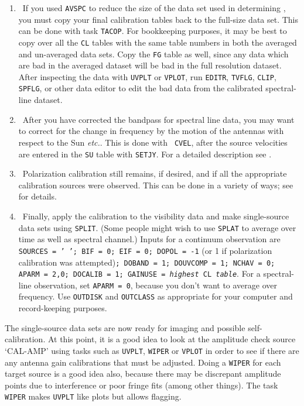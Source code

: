 
\begin{enumerate}

\item\ {If you used {\tt AVSPC} to reduce the size of the data set
used in determining , you must copy your final
calibration tables back to the full-size data set.  This can be done
with task {\tt TACOP}\@.  For bookkeeping purposes, it may be best to
copy over all the {\tt CL} tables with the same table numbers in both
the averaged and un-averaged data sets. Copy the {\tt FG} table as
well, since  any data which are bad in the averaged dataset will be
bad in the full resolution dataset.  After inspecting the data with
{\tt UVPLT} or {\tt VPLOT}, run {\tt EDITR}, {\tt TVFLG}, {\tt CLIP},
{\tt SPFLG}, or other data editor to edit the bad data from the
calibrated spectral-line dataset.}

\item\ {After you have corrected the bandpass for spectral line data,
you may want to correct for the change in frequency by the motion of the
antennas with respect to the Sun {\it etc.}. This is done with {\tt
CVEL}, after the source velocities are entered in the {\tt SU} table
with {\tt SETJY}\@.  For a detailed description see \@.\@}

\item\ {Polarization calibration still remains, if desired, and if all
the appropriate calibration sources were observed.  This can be done
in a variety of ways; see  for details.}

\item\ {Finally, apply the calibration to the visibility data and make
single-source data sets using {\tt SPLIT}\@.  (Some people
might wish to use {\tt SPLAT} to average over time as well as spectral
channel.) Inputs for a continuum observation are {\tt SOURCES = '~';
BIF = 0; EIF = 0; DOPOL = -1} (or 1 if polarization calibration was
attempted){\tt ; DOBAND = 1; DOUVCOMP = 1; NCHAV = 0; APARM = 2,0;
DOCALIB = 1; GAINUSE = {\it highest} CL {\it table}}\@.  For a
spectral-line observation, set {\tt APARM = 0}, because you don't want to
average over frequency.  Use {\tt OUTDISK} and {\tt OUTCLASS} as
appropriate for your computer and record-keeping purposes.}

\end{enumerate}

The single-source data sets are now ready for imaging and possible
self-calibration.  At this point, it is a good idea to look at the
amplitude check source `CAL-AMP' using tasks such as {\tt UVPLT}, {\tt WIPER}
or {\tt VPLOT} in order to see if there are any antenna gain calibrations that
must be adjusted.  Doing a {\tt WIPER} for each target source is a
good idea also, because there may be discrepant amplitude points due
to interference or poor fringe fits (among other things).  The task
{\tt WIPER} makes {\tt UVPLT} like plots but allows flagging.

